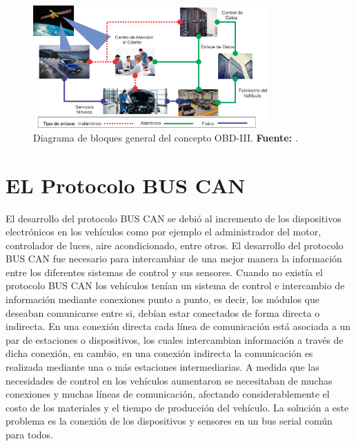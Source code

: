 \begin{figure}[H]
	\centering
		\includegraphics[width=0.8\textwidth]{./Cap2imagen/J_concepto_OBDIII.png}
	\caption[Diagrama de bloques general del concepto OBD-III.]{Diagrama de bloques general del concepto OBD-III.\textbf{ Fuente:} \cite{DE}.}
	\label{DenB} %
\end{figure}


\section {EL Protocolo BUS CAN}

El desarrollo del  protocolo BUS CAN se debió al incremento de los dispositivos electrónicos en los vehículos como por ejemplo el administrador del motor, controlador de luces, aire acondicionado, entre otros.  
El desarrollo del protocolo BUS CAN fue necesario para intercambiar de una mejor manera la información entre los diferentes sistemas de control y sus sensores.
Cuando no existía el protocolo BUS CAN los vehículos tenían un sistema de control e intercambio de información mediante conexiones punto a punto, es decir, los módulos que deseaban comunicarse entre si, debían estar conectados de forma directa o indirecta.
En una conexión  directa  cada línea de comunicación está asociada a un par de estaciones o dispositivos, los cuales intercambian información a través de dicha conexión, en cambio, en una conexión indirecta  la comunicación es realizada  mediante una o más estaciones intermediarias.
A medida que las necesidades de control en los vehículos  aumentaron se necesitaban de muchas conexiones y muchas líneas de comunicación, afectando considerablemente el costo de los materiales y el tiempo de producción del vehículo. 
La solución a este problema es la conexión de los dispositivos y sensores en un bus serial común para todos.

